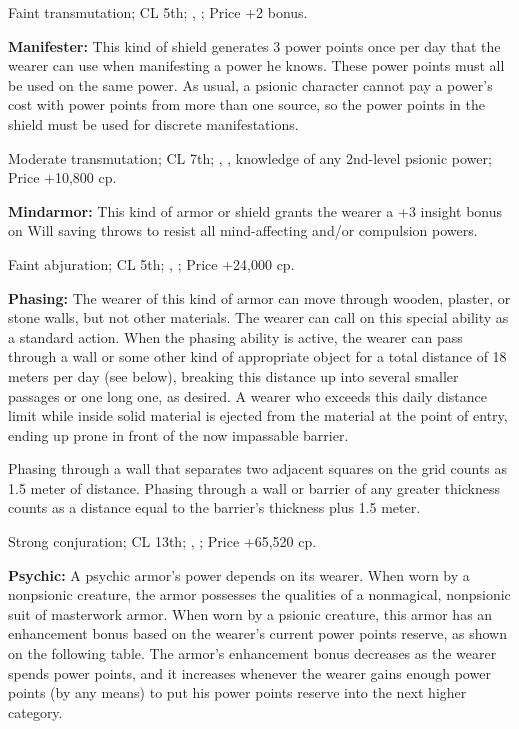 Faint transmutation; CL 5th; , ; Price +2 bonus.

\textbf{Manifester:} This kind of shield generates 3 power points once per day that the wearer can use when manifesting a power he knows. These power points must all be used on the same power. As usual, a psionic character cannot pay a power's cost with power points from more than one source, so the power points in the shield must be used for discrete manifestations.

Moderate transmutation; CL 7th; , , knowledge of any 2nd-level psionic power; Price +10,800 cp.

\textbf{Mindarmor:} This kind of armor or shield grants the wearer a +3 insight bonus on Will saving throws to resist all mind-affecting and/or compulsion powers.

Faint abjuration; CL 5th; , ; Price +24,000 cp.

\textbf{Phasing:} The wearer of this kind of armor can move through wooden, plaster, or stone walls, but not other materials. The wearer can call on this special ability as a standard action. When the phasing ability is active, the wearer can pass through a wall or some other kind of appropriate object for a total distance of 18 meters per day (see below), breaking this distance up into several smaller passages or one long one, as desired. A wearer who exceeds this daily distance limit while inside solid material is ejected from the material at the point of entry, ending up prone in front of the now impassable barrier.

Phasing through a wall that separates two adjacent squares on the grid counts as 1.5 meter of distance. Phasing through a wall or barrier of any greater thickness counts as a distance equal to the barrier's thickness plus 1.5 meter.

Strong conjuration; CL 13th; , ; Price +65,520 cp.

\textbf{Psychic:} A psychic armor's power depends on its wearer. When worn by a nonpsionic creature, the armor possesses the qualities of a nonmagical, nonpsionic suit of masterwork armor. When worn by a psionic creature, this armor has an enhancement bonus based on the wearer's current power points reserve, as shown on the following table. The armor's enhancement bonus decreases as the wearer spends power points, and it increases whenever the wearer gains enough power points (by any means) to put his power points reserve into the next higher category.

